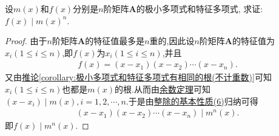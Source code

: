 \documentclass[../../main.tex]{subfiles}
\begin{document}
\begin{example}
设\(m(x)\)和\(f(x)\)分别是\(n\)阶矩阵\(\boldsymbol{A}\)的极小多项式和特征多项式, 求证: \(f(x)\mid m(x)^n\).
\end{example}
\begin{proof}
由于\(n\)阶矩阵\(\boldsymbol{A}\)的特征值最多是\(n\)重的,因此设\(n\)阶矩阵\(\boldsymbol{A}\)的特征值为$x_i(1\leqslant  i\leqslant  n)$,即$f(x)$为$x_i(1\leqslant  i\leqslant  n)$,并且
\begin{align*}
f(x)=(x-x_1)(x-x_2)\cdots(x-x_n).
\end{align*}
又由\hyperref[corollary:极小多项式和特征多项式有相同的根(不计重数)]{推论\ref{corollary:极小多项式和特征多项式有相同的根(不计重数)}}可知$x_i(1\leqslant  i\leqslant  n)$也都是$m(x)$的根.从而由\hyperref[theorem:余数定理]{余数定理}可知$(x-x_i)\mid m(x),i=1,2,\cdots,n$.于是由\hyperref[proposition:整除的基本性质]{整除的基本性质(6)}归纳可得
\begin{align*}
(x-x_1)(x-x_2)\cdots(x-x_n)\mid m^n(x).
\end{align*}
即$f(x)\mid m^n(x)$.
\end{proof}
\end{document}
